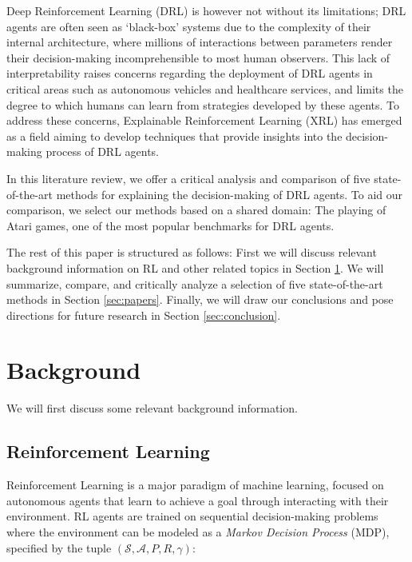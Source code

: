 \documentclass[sigconf]{acmart}
\begin{document}
Deep Reinforcement Learning (DRL) is however not without its limitations;
DRL agents are often seen as `black-box' systems due to the complexity of their internal architecture, where millions of interactions between parameters render their decision-making incomprehensible to most human observers\cite{li2018deepreinforcementlearningoverview,csahin2025unlocking}.
This lack of interpretability raises concerns regarding the deployment of DRL agents in critical areas such as autonomous vehicles and healthcare services, and limits the degree to which humans can learn from strategies developed by these agents\cite{csahin2025unlocking,Cheng2025}.
To address these concerns, Explainable Reinforcement Learning (XRL) has emerged as a field aiming to develop techniques that provide insights into the decision-making process of DRL agents\cite{Cheng2025}.

In this literature review, we offer a critical analysis and comparison of five state-of-the-art methods for explaining the decision-making of DRL agents.
To aid our comparison, we select our methods based on a shared domain: The playing of Atari games, one of the most popular benchmarks for DRL agents\cite{hosu2016playingatarigamesdeep}.

The rest of this paper is structured as follows:
First we will discuss relevant background information on RL and other related topics in Section \ref{sec:background}.
We will summarize, compare, and critically analyze a selection of five state-of-the-art methods in Section \ref{sec:papers}.
Finally, we will draw our conclusions and pose directions for future research in Section \ref{sec:conclusion}.

%
%
\section{Background} \label{sec:background}
We will first discuss some relevant background information.

\subsection{Reinforcement Learning}
Reinforcement Learning is a major paradigm of machine learning, focused on autonomous agents that learn to achieve a goal through interacting with their environment\cite{sutton1992introduction,Cheng2025,andrew2018reinforcement}.
RL agents are trained on sequential decision-making problems where the environment can be modeled as a \textit{Markov Decision Process} (MDP), specified by the tuple $(\mathcal{S}, \mathcal{A}, P, R, \gamma)$: \cite{Cheng2025,andrew2018reinforcement}
\end{document}
